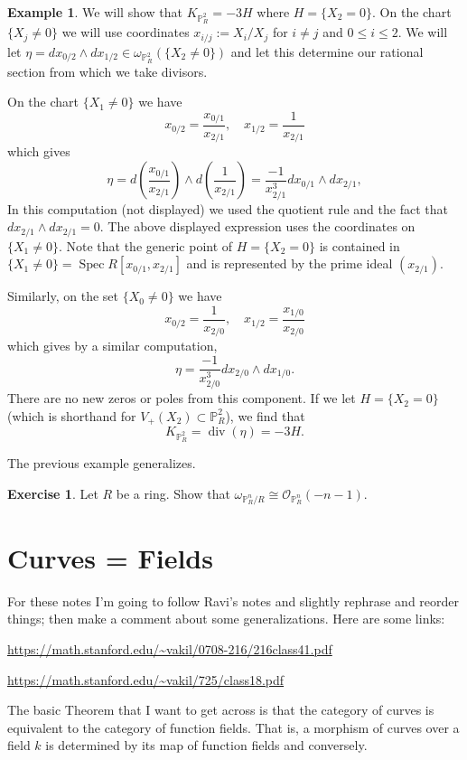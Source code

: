 \documentclass[12pt]{article}
\numberwithin{equation}{section}
\theoremstyle{definition}
\newtheorem{example}[theorem]{Example}
\newtheorem{exercise}[theorem]{Exercise}
\theoremstyle{remark}
\newcommand{\Ocal}{\mathcal{O}}
\newcommand{\PP}{\mathbb{P}}
\newcommand{\Spec}{\operatorname{Spec}}
\renewcommand{\div}{\operatorname{div}}
\begin{document}
\begin{example}
	We will show that $K_{\PP^2_R}= -3H$ where $H = \lbrace X_2 =0 \rbrace$. 
	On the chart $\lbrace X_j \neq 0 \rbrace$ we will use coordinates $x_{i/j}:=X_i/X_j$ for $i\neq j$ and $0\leq i \leq 2$. 
	We will let $\eta = dx_{0/2} \wedge dx_{1/2}\in \omega_{\PP^2_R}(\lbrace X_2 \neq 0 \rbrace)$ and let this determine our rational section from which we take divisors.
	
	On the chart $\lbrace X_1 \neq 0 \rbrace$ we have 
	$$x_{0/2} = \dfrac{x_{0/1}}{x_{2/1}}, \quad x_{1/2}=\dfrac{1}{x_{2/1}}$$ 
	which gives 
	$$ \eta = d\left(\frac{x_{0/1}}{x_{2/1}}\right) \wedge d \left( \frac{1}{x_{2/1}} \right)=\frac{-1}{x_{2/1}^3} dx_{0/1}\wedge dx_{2/1},$$
	In this computation (not displayed) we used the quotient rule and the fact that $dx_{2/1}\wedge dx_{2/1}=0$.
	The above displayed expression uses the coordinates on $\lbrace X_1\neq 0 \rbrace$. 
	Note that the generic point of $H = \lbrace X_2=0\rbrace$ is contained in $\lbrace X_1 \neq 0 \rbrace = \Spec R[x_{0/1},x_{2/1}]$ and is represented by the prime ideal $(x_{2/1})$. 
	
	Similarly, on the set $\lbrace X_0 \neq 0 \rbrace$ we have 
	$$x_{0/2} = \dfrac{1}{x_{2/0}}, \quad x_{1/2} = \dfrac{x_{1/0}}{x_{2/0}}$$ which gives by a similar computation,
	$$\eta  = \frac{-1}{x_{2/0}^3} dx_{2/0}\wedge dx_{1/0}. $$
	There are no new zeros or poles from this component.
	If we let $H = \lbrace X_2=0 \rbrace$ (which is shorthand for $V_+(X_2) \subset \PP^2_R$), we find that 
	 $$K_{\PP^2_R} =\div(\eta) = -3H.$$
\end{example}

The previous example generalizes. 
\begin{exercise}
	Let $R$ be a ring. 
	Show that $\omega_{\PP^n_R/R} \cong \Ocal_{\PP^n_R}(-n-1)$.
\end{exercise}

\section{Curves = Fields}
For these notes I'm going to follow Ravi's notes and slightly rephrase and reorder things; then make a comment about some generalizations.
Here are some links:
\begin{center}
	\url{https://math.stanford.edu/~vakil/0708-216/216class41.pdf}
\end{center}
\begin{center}
	\url{https://math.stanford.edu/~vakil/725/class18.pdf}
\end{center}
The basic Theorem that I want to get across is that the category of curves is equivalent to the category of function fields. 
That is, a morphism of curves over a field $k$ is determined by its map of function fields and conversely. 
\end{document}
